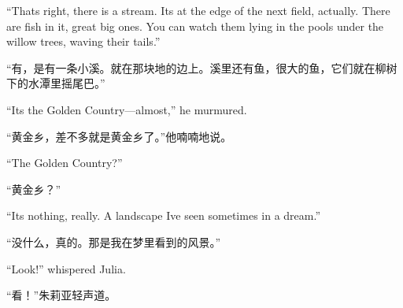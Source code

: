 \begin{paracol}{2}
\switchcolumn*

``That\textquotesingle s right, there is a stream. It\textquotesingle s
at the edge of the next field, actually. There are fish in it, great big
ones. You can watch them lying in the pools under the willow trees,
waving their tails.''

\switchcolumn

``有，是有一条小溪。就在那块地的边上。溪里还有鱼，很大的鱼，它们就在柳树下的水潭里摇尾巴。''

\switchcolumn*

``It\textquotesingle s the Golden Country---almost,'' he murmured.

\switchcolumn

``黄金乡，差不多就是黄金乡了。''他喃喃地说。

\switchcolumn*

``The Golden Country?''

\switchcolumn

``黄金乡？''

\switchcolumn*

``It\textquotesingle s nothing, really. A landscape I\textquotesingle ve
seen sometimes in a dream.''

\switchcolumn

``没什么，真的。那是我在梦里看到的风景。''

\switchcolumn*

``Look!'' whispered Julia.

\switchcolumn

``看！''朱莉亚轻声道。

\switchcolumn*


\end{paracol}
